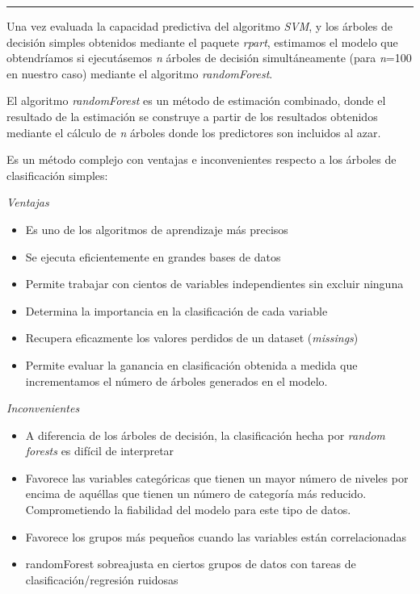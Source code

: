 \documentclass[]{article}
\begin{document}
\begin{center}\rule{0.5\linewidth}{\linethickness}\end{center}

Una vez evaluada la capacidad predictiva del algoritmo \emph{SVM}, y los
árboles de decisión simples obtenidos mediante el paquete \emph{rpart},
estimamos el modelo que obtendríamos si ejecutásemos \emph{n} árboles de
decisión simultáneamente (para \emph{n}=100 en nuestro caso) mediante el
algoritmo \emph{randomForest}.

El algoritmo \emph{randomForest} es un método de estimación combinado,
donde el resultado de la estimación se construye a partir de los
resultados obtenidos mediante el cálculo de \emph{n} árboles donde los
predictores son incluidos al azar.

Es un método complejo con ventajas e inconvenientes respecto a los
árboles de clasificación simples:

\emph{Ventajas}

\begin{itemize}
\item
  Es uno de los algoritmos de aprendizaje más precisos
\item
  Se ejecuta eficientemente en grandes bases de datos
\item
  Permite trabajar con cientos de variables independientes sin excluir
  ninguna
\item
  Determina la importancia en la clasificación de cada variable
\item
  Recupera eficazmente los valores perdidos de un dataset
  (\emph{missings})
\item
  Permite evaluar la ganancia en clasificación obtenida a medida que
  incrementamos el número de árboles generados en el modelo.
\end{itemize}

\emph{Inconvenientes}

\begin{itemize}
\item
  A diferencia de los árboles de decisión, la clasificación hecha por
  \emph{random forests} es difícil de interpretar
\item
  Favorece las variables categóricas que tienen un mayor número de
  niveles por encima de aquéllas que tienen un número de categoría más
  reducido. Comprometiendo la fiabilidad del modelo para este tipo de
  datos.
\item
  Favorece los grupos más pequeños cuando las variables están
  correlacionadas
\item
  randomForest sobreajusta en ciertos grupos de datos con tareas de
  clasificación/regresión ruidosas
\end{itemize}
\end{document}
